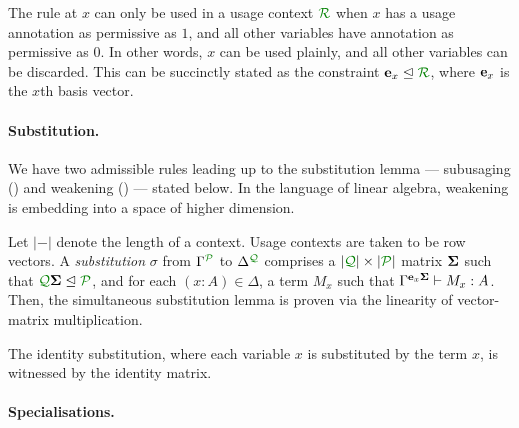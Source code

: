 \documentclass[a4paper]{easychair}
\begin{document}
The  rule at $x$ can only be used in a usage context $\resctx R$
when $x$ has a usage annotation as permissive as $1$, and all other variables
have annotation as permissive as $0$.
In other words, $x$ can be used plainly, and all other variables can be
discarded.
This can be succinctly stated as the constraint $\vct e_x \subres \resctx R$,
where $\mathbf{e}_x$ is the $x$th basis vector.

\paragraph{Substitution.}

We have two admissible rules leading up to the substitution lemma --- subusaging
() and weakening () --- stated below.
In the language of linear algebra, weakening is embedding into a space of higher
dimension.

Let $|-|$ denote the length of a context.
Usage contexts are taken to be row vectors.
A \emph{substitution} $\sigma$ from $\ctx{\Gamma}{P}$ to $\ctx{\Delta}{Q}$
comprises a $|\resctx Q| \times |\resctx P|$ matrix $\mathbf{\Sigma}$ such that
$\resctx Q \mat \Sigma \subres \resctx P$, and for each $(x:A) \in \Delta$, a
term $M_x$ such that $\Gamma^{\mathbf{e}_x \mathbf{\Sigma}} \vdash M_x : A$.
Then, the simultaneous substitution lemma is proven via the linearity of
vector-matrix multiplication.


The identity substitution, where each variable $x$ is substituted by the term
$x$, is witnessed by the identity matrix.

\paragraph{Specialisations.}
\label{sec:specialisations}
\end{document}
